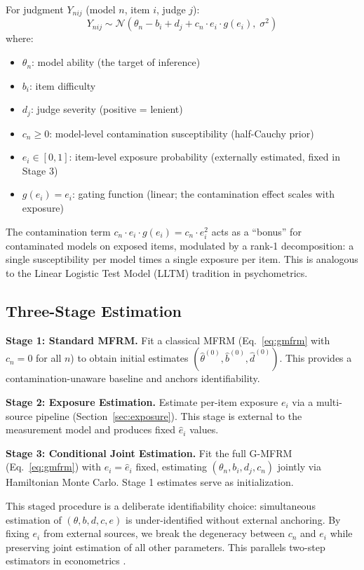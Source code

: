 \documentclass[11pt]{article}
\newcommand{\gmfrm}{G-MFRM}
\newcommand{\cn}{c_n}
\newcommand{\ei}{e_i}
\renewcommand{\dj}{d_j}
\begin{document}
For judgment $Y_{nij}$ (model $n$, item $i$, judge $j$):
\begin{equation}
Y_{nij} \sim \mathcal{N}\!\left(\theta_n - b_i + \dj + \cn \cdot \ei \cdot g(\ei),\; \sigma^2\right)
\label{eq:gmfrm}
\end{equation}
where:
\begin{itemize}[leftmargin=*,itemsep=1pt]
\item $\theta_n$: model ability (the target of inference)
\item $b_i$: item difficulty
\item $\dj$: judge severity (positive = lenient)
\item $\cn \geq 0$: model-level contamination susceptibility (half-Cauchy prior)
\item $\ei \in [0,1]$: item-level exposure probability (externally estimated, fixed in Stage 3)
\item $g(\ei) = \ei$: gating function (linear; the contamination effect scales with exposure)
\end{itemize}

The contamination term $\cn \cdot \ei \cdot g(\ei) = \cn \cdot \ei^2$ acts as a ``bonus'' for contaminated models on exposed items, modulated by a rank-1 decomposition: a single susceptibility per model times a single exposure per item. This is analogous to the Linear Logistic Test Model (LLTM) tradition in psychometrics.

\subsection{Three-Stage Estimation}

\textbf{Stage 1: Standard MFRM.} Fit a classical MFRM (Eq.~\ref{eq:gmfrm} with $\cn = 0$ for all $n$) to obtain initial estimates $(\hat{\theta}^{(0)}, \hat{b}^{(0)}, \hat{d}^{(0)})$. This provides a contamination-unaware baseline and anchors identifiability.

\textbf{Stage 2: Exposure Estimation.} Estimate per-item exposure $\ei$ via a multi-source pipeline (Section~\ref{sec:exposure}). This stage is external to the measurement model and produces fixed $\hat{e}_i$ values.

\textbf{Stage 3: Conditional Joint Estimation.} Fit the full \gmfrm{} (Eq.~\ref{eq:gmfrm}) with $\ei = \hat{e}_i$ fixed, estimating $(\theta_n, b_i, \dj, \cn)$ jointly via Hamiltonian Monte Carlo. Stage 1 estimates serve as initialization.

This staged procedure is a deliberate identifiability choice: simultaneous estimation of $(\theta, b, d, c, e)$ is under-identified without external anchoring. By fixing $\ei$ from external sources, we break the degeneracy between $\cn$ and $\ei$ while preserving joint estimation of all other parameters. This parallels two-step estimators in econometrics \citep{heckman1979sample}.
\end{document}
